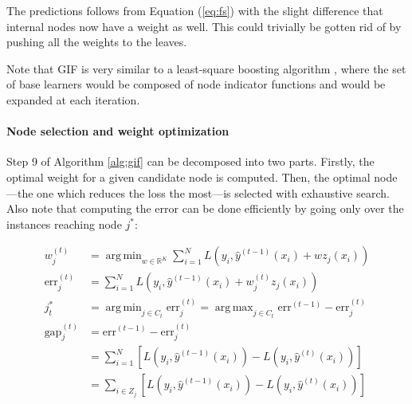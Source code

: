 \documentclass{article}
\DeclareMathOperator*{\argmin}{arg\,min}
\DeclareMathOperator*{\argmax}{arg\,max}
\begin{document}
The predictions follows from Equation (\ref{eq:fs}) with the slight difference 
that 
internal nodes now have a weight as well. This could trivially be gotten rid of 
by pushing all the weights to the leaves.


Note that GIF is very similar to a least-square boosting algorithm
\cite{hastie2009}, where the set of base learners would be composed of
node indicator functions and would be expanded at each iteration.

\paragraph{Node selection and weight optimization}
Step 9 of Algorithm \ref{alg:gif} can be decomposed into two parts. Firstly, 
the optimal weight for a given candidate node is computed. Then, the optimal 
node---the one which reduces the loss the most---is selected with 
exhaustive search. Also note that computing the error can be done efficiently 
by going only over the instances reaching node $j^*$:

\begin{align}\label{eq:nodeSel}
w_j^{(t)} &= \argmin_{w \in \mathbb{R}^K} \sum_{i=1}^{N} L \left(y_i, 
\hat{y}^{(t-1)}(x_i) + w z_j(x_i)  \right) \\
\text{err}_j^{(t)} &= \sum_{i=1}^{N} L \left(y_i, \hat{y}^{(t-1)}(x_i) + 
w_j^{(t)} z_j(x_i)  \right) \\
j_t^* &= \argmin_{j \in C_t} \text{err}_j^{(t)} = \argmax_{j \in C_t} 
\text{err}^{(t-1)} - \text{err}_j^{(t)} \\
\text{gap}_j^{(t)} &= \text{err}^{(t-1)} - \text{err}_j^{(t)} \\
&= \sum_{i=1}^{N} \left[ L\left(y_i, \hat{y}^{(t-1)}(x_i)\right) - L\left(y_i, 
\hat{y}^{(t)}(x_i)\right) \right] \\
&= \sum_{i\in Z_j} \left[ L\left(y_i, \hat{y}^{(t-1)}(x_i)\right) - L\left(y_i, 
\hat{y}^{(t)}(x_i)\right) \right]
\end{align}
\end{document}
